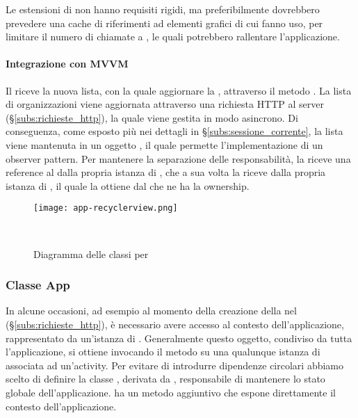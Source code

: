 \documentclass[../../manuale-manutentore.tex]{subfiles}
\begin{document}
Le estensioni di  non hanno requisiti rigidi, ma preferibilmente dovrebbero prevedere una cache di riferimenti ad elementi grafici di cui fanno uso, per limitare il numero di chiamate a , le quali potrebbero rallentare l'applicazione.

\paragraph{Integrazione con MVVM}%
\label{par:integrazione_con_mvvm}

Il  riceve la nuova lista, con la quale aggiornare la , attraverso il metodo \linebreak{}.
La lista di organizzazioni viene aggiornata attraverso una richiesta HTTP al server (§\ref{subs:richieste_http}), la quale viene gestita in modo asincrono.
Di conseguenza, come esposto più nei dettagli in §\ref{subs:sessione_corrente}, la lista viene mantenuta in un oggetto , il quale permette l'implementazione di un observer pattern.
Per mantenere la separazione delle responsabilità, la  riceve una reference al  dalla propria istanza di , che a sua volta la riceve dalla propria istanza di , il quale la ottiene dal  che ne ha la ownership.

\begin{figure}[h]
  \centering
  \texttt{[image: app-recyclerview.png]}
  \caption{Diagramma delle classi per }
~~\label{fig:app/diagramma_classi_recyclerview}
\end{figure}

\subsubsection{Classe App}%
\label{subs:classe_app}

In alcune occasioni, ad esempio al momento della creazione della  nel  (§\ref{subs:richieste_http}), è necessario avere accesso al contesto dell'applicazione, rappresentato da un'istanza di .
Generalmente questo oggetto, condiviso da tutta l'applicazione, si ottiene invocando il metodo  su una qualunque istanza di  associata ad un'activity.
Per evitare di introdurre dipendenze circolari abbiamo scelto di definire la classe , derivata da , responsabile di mantenere lo stato globale dell'applicazione.
 ha un metodo aggiuntivo  che espone direttamente il contesto dell'applicazione.
\end{document}
